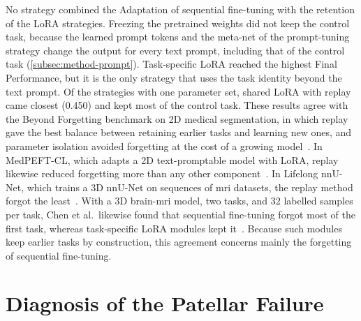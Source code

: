 No strategy combined the Adaptation of sequential fine-tuning with the retention of the LoRA strategies.
Freezing the pretrained weights did not keep the control task, because the learned prompt tokens and the meta-net of the prompt-tuning strategy change the output for every text prompt, including that of the control task (\cref{subsec:method-prompt}).
Task-specific LoRA reached the highest Final Performance, but it is the only strategy that uses the task identity beyond the text prompt.
Of the strategies with one parameter set, shared LoRA with replay came closest (0.450) and kept most of the control task.
These results agree with the Beyond Forgetting benchmark on 2D medical segmentation, in which replay gave the best balance between retaining earlier tasks and learning new ones, and parameter isolation avoided forgetting at the cost of a growing model~\cite[Sec.~5]{wang2026beyondforgetting}.
In MedPEFT-CL, which adapts a 2D text-promptable model with LoRA, replay likewise reduced forgetting more than any other component~\cite[Table~8]{gao2026medpeftcl}.
In Lifelong nnU-Net, which trains a 3D nnU-Net on sequences of \gls{mri} datasets, the replay method forgot the least~\cite{gonzalez2023lifelong}.
With a 3D brain-\gls{mri} model, two tasks, and 32 labelled samples per task, Chen et al.\ likewise found that sequential fine-tuning forgot most of the first task, whereas task-specific LoRA modules kept it~\cite[Table~1]{chen2026fewshotcontinuallearning3d}.
Because such modules keep earlier tasks by construction, this agreement concerns mainly the forgetting of sequential fine-tuning.

\section{Diagnosis of the Patellar Failure}
\label{sec:exp-patellar}

